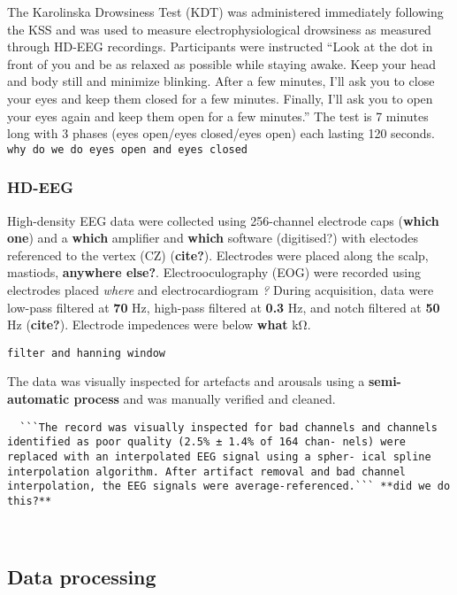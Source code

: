 \documentclass[
]{article}
\begin{document}
The Karolinska Drowsiness Test (KDT) was administered immediately
following the KSS and was used to measure electrophysiological
drowsiness as measured through HD-EEG recordings. Participants were
instructed ``Look at the dot in front of you and be as relaxed as
possible while staying awake. Keep your head and body still and minimize
blinking. After a few minutes, I'll ask you to close your eyes and keep
them closed for a few minutes. Finally, I'll ask you to open your eyes
again and keep them open for a few minutes.'' The test is 7 minutes long
with 3 phases (eyes open/eyes closed/eyes open) each lasting 120
seconds. \texttt{why\ do\ we\ do\ eyes\ open\ and\ eyes\ closed}

\subsubsection{HD-EEG}\label{hd-eeg}

High-density EEG data were collected using 256-channel electrode caps
(\textbf{which one}) and a \textbf{which} amplifier and \textbf{which}
software (digitised?) with electodes referenced to the vertex (CZ)
(\textbf{cite?}). Electrodes were placed along the scalp, mastiods,
\textbf{anywhere else?}. Electrooculography (EOG) were recorded using
electrodes placed \emph{where} and electrocardiogram \emph{?} During
acquisition, data were low-pass filtered at \textbf{70} Hz, high-pass
filtered at \textbf{0.3} Hz, and notch filtered at \textbf{50} Hz
(\textbf{cite?}). Electrode impedences were below \textbf{what} kΩ.

\texttt{filter\ and\ hanning\ window}

The data was visually inspected for artefacts and arousals using a
\textbf{semi-automatic process} and was manually verified and cleaned.

\begin{verbatim}
  ```The record was visually inspected for bad channels and channels identified as poor quality (2.5% ± 1.4% of 164 chan- nels) were replaced with an interpolated EEG signal using a spher- ical spline interpolation algorithm. After artifact removal and bad channel interpolation, the EEG signals were average-referenced.``` **did we do this?**
  
  
\end{verbatim}

\subsection{Data processing}\label{data-processing}
\end{document}
